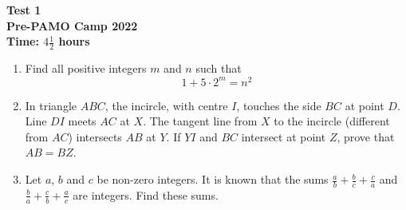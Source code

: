 \documentclass{article}
\begin{document}
	\thispagestyle{empty}
	
	\begin{center}
		\textbf{\Large Test 1}
		\\ \vspace{1em}
		\textbf{\large Pre-PAMO Camp 2022}
		\\ \vspace{1em}
		\textbf{\large Time: $4\frac{1}{2}$ hours}
	\end{center}
	
	\vspace{24pt}
	
	\begin{enumerate}[itemsep=12pt]
		
		\item %
		Find all positive integers $m$ and $n$ such that
		$$1+5 \cdot 2^m = n^2$$
		
		\item %
		In triangle $ABC$, the incircle, with centre $I$, touches the side $BC$ at point $D$. Line $DI$ meets $AC$ at $X$. The tangent line from $X$ to the incircle (different
		from $AC$) intersects $AB$ at $Y$. If $YI$ and $BC$ intersect at point $Z$, prove that $AB = BZ$.
		
		\item %
		Let $a$, $b$ and $c$ be non-zero integers. It is known that the sums $\frac{a}{b} + \frac{b}{c} + \frac{c}{a}$ and $\frac{b}{a} + \frac{c}{b} + \frac{a}{c}$ are 
		integers. Find these sums.
		
		
	\end{enumerate}
	

	
\end{document}
